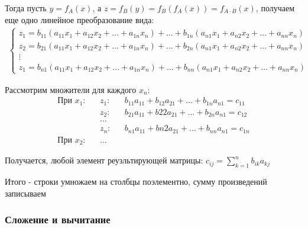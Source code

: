\documentclass[class=article,a4paper,12pt,crop=false]{standalone}
\begin{document}
Тогда пусть $y = f_A(x)$, а $z = f_B(y) = f_B(f_A(x)) = f_{A\cdot B}(x)$, получаем еще одно
линейное преобразование вида:
\begin{eqnarray}
    \begin{cases}
        z_1 = b_{11}(a_{11}x_1 + a_{12}x_2 + \dots + a_{1n}x_n) + \dots + b_{1n}(a_{n1}x_1 + a_{n2}x_2 + \dots + a_{nn}x_n) \\
        z_2 = b_{21}(a_{11}x_1 + a_{12}x_2 + \dots + a_{1n}x_n) + \dots + b_{2n}(a_{n1}x_1 + a_{n2}x_2 + \dots + a_{nn}x_n) \\
        \vdots \\
        z_1 = b_{n1}(a_{11}x_1 + a_{12}x_2 + \dots + a_{1n}x_n) + \dots + b_{nn}(a_{n1}x_1 + a_{n2}x_2 + \dots + a_{nn}x_n)
    \end{cases}
\end{eqnarray}

Рассмотрим множители для каждого $x_n$:
\begin{equation}
    \begin{aligned}
        \text{При } x_1: & & z_1: & & b_{11}a_{11} + b_{12}a_{21} + \dots + b_{1n}a_{n1} = c_{11}\\
        & & z_2: & & b_{21}a_{11} + b{22}a_{21} + \dots + b_{2n}a_{n1} = c_{12} \\
        & & \dots \\
        & & z_n: & & b_{n1}a_{11} + b{n2}a_{21} + \dots + b_{nn}a_{n1} = c_{1n} \\
        \text{При } x_2: & & \dots
    \end{aligned}
\end{equation}

Получается, любой элемент реузльтирующей матрицы: $c_{ij} = \sum\limits_{k = 1}^nb_{ik}a_{kj}$

Итого - строки умножаем на столбцы поэлементно, сумму произведений записываем

\subsubsection{Сложение и вычитание}
\end{document}
